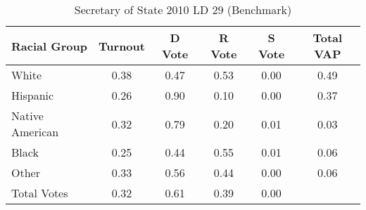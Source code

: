\begin{table}[htb]
\begin{center}
\caption{Secretary of State 2010 LD 29 (Benchmark)}
\label{sos10_vap_ld_29_benchmark}
\begin{tabular}{lccccc}
  \hline
Racial Group & Turnout & D Vote & R Vote & S Vote & Total VAP \\ 
  \hline
White & 0.38 & 0.47 & 0.53 & 0.00 & 0.49 \\ 
  Hispanic & 0.26 & 0.90 & 0.10 & 0.00 & 0.37 \\ 
  Native American & 0.32 & 0.79 & 0.20 & 0.01 & 0.03 \\ 
  Black & 0.25 & 0.44 & 0.55 & 0.01 & 0.06 \\ 
  Other & 0.33 & 0.56 & 0.44 & 0.00 & 0.06 \\ 
  Total Votes & 0.32 & 0.61 & 0.39 & 0.00 &  \\ 
   \hline
\end{tabular}
\end{center}
\end{table}
